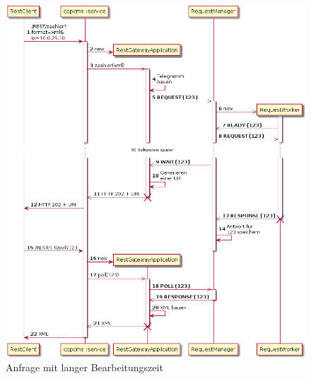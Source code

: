 \documentclass{article}
\begin{document}
\begin{figure}[h]
\centering
\includegraphics[scale=0.35]{praktikumsbericht_006.png}
\caption{Anfrage mit langer Bearbeitungszeit}
\label{fig:async_long_request_handling}
\end{figure}
\end{document}
